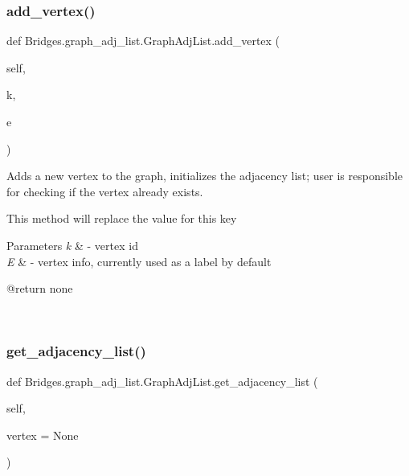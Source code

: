 \subsubsection{\texorpdfstring{add\+\_\+vertex()}{add\_vertex()}}
{\footnotesize\ttfamily def Bridges.\+graph\+\_\+adj\+\_\+list.\+Graph\+Adj\+List.\+add\+\_\+vertex (\begin{DoxyParamCaption}\item[{}]{self,  }\item[{}]{k,  }\item[{}]{e }\end{DoxyParamCaption})}



Adds a new vertex to the graph, initializes the adjacency list; user is responsible for checking if the vertex already exists. 

This method will replace the value for this key


\begin{DoxyParams}{Parameters}
{\em k} & -\/ vertex id \\
\hline
{\em E} & -\/ vertex info, currently used as a label by default \begin{DoxyVerb}@return none\end{DoxyVerb}
 \\
\hline
\end{DoxyParams}
\mbox{\label{class_bridges_1_1graph__adj__list_1_1_graph_adj_list_aaec1428d2d56a5f71a47406ac8aa9031}} 
\subsubsection{\texorpdfstring{get\+\_\+adjacency\+\_\+list()}{get\_adjacency\_list()}}
{\footnotesize\ttfamily def Bridges.\+graph\+\_\+adj\+\_\+list.\+Graph\+Adj\+List.\+get\+\_\+adjacency\+\_\+list (\begin{DoxyParamCaption}\item[{}]{self,  }\item[{}]{vertex = {\ttfamily None} }\end{DoxyParamCaption})}



